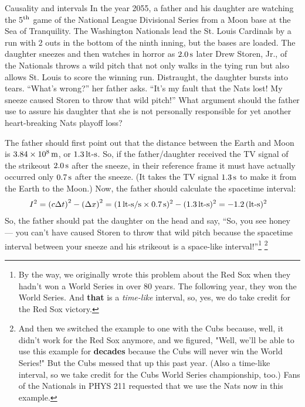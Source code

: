 \begin{example}{Causality and intervals}  
  In the year 2055, a father and his daughter are watching the 5$^{\rm
    th}$ game of the National League Divisional Series from a Moon base at the Sea of
  Tranquility.  The Washington Nationals lead the St. Louis Cardinals by a run with 2 outs 
  in the bottom of the ninth
  inning, but the bases are loaded. The daughter sneezes and then watches in horror as
  $2.0\,\mbox{s}$ later Drew Storen, Jr., of the Nationals throws
  a wild pitch that not only walks in the tying run but also allows St. Louis to
  score the winning run. Distraught, the
  daughter bursts into tears. ``What's wrong?'' her father asks.
  ``It's my fault that the Nats lost!  My sneeze caused Storen to throw
  that wild pitch!'' What argument should the father use to assure his daughter
  that she is not personally responsible for yet another
  heart-breaking Nats playoff loss?  

\solution The father should first point
  out that the distance between the Earth and Moon is $3.84\times
  10^8\,\mbox{m}$, or $1.3\,\mbox{lt-s}$.  So, if the father/daughter
  received the TV signal of the strikeout $2.0\,\mbox{s}$ after the
  sneeze, in their reference frame it must have actually occurred only
  $0.7\,\mbox{s}$ after the sneeze.  (It takes the TV signal
  $1.3\,\mbox{s}$ to make it from the Earth to the Moon.)  Now, the
  father should calculate the spacetime interval:
\begin{align}
I^2 &= \left(c\Delta t\right)^2 - \left(\Delta x\right)^2 %
    = (1\units{lt-s/s}\times 0.7\units{s})^2 - 
                    (1.3\units{lt-s})^2 %
    = -1.2\, (\mbox{lt-s})^2 \nonumber 
\end{align}
So, the father should pat the daughter on the head and say, ``So,
you see honey ---  you can't have caused Storen to throw that wild pitch 
because the spacetime interval between your sneeze and his strikeout
is a space-like interval!''\footnote{By the way, we originally wrote this
problem about the Red Sox when they hadn't won a World Series in over 80
years. The following year, they won the World Series. And {\bf that} is a
{\em time-like} interval, so, yes, we do take credit for the Red
Sox victory.}
\footnote{And then we switched the example to one with the Cubs because,
well, it didn't work for the Red Sox anymore, and we figured, "Well, we'll be
able to use this example for {\bf decades} because the Cubs will never win
the World Series!" But the Cubs messed that up this past year. (Also a
time-like interval, so we take credit for the Cubs World Series
championship, too.) Fans of
the Nationals in PHYS 211 requested that we use the Nats now in this example.}
\label{example:causality-intervals}
\end{example}

